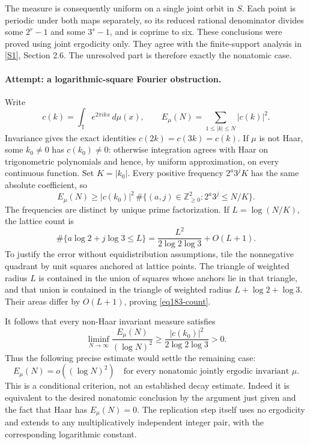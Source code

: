 \documentclass[11pt,a4paper]{article}
\newcommand{\Z}{\mathbb{Z}}
\newcommand{\sref}[2]{\hyperlink{source:#1:#2}{[S#2]}}
\numberwithin{equation}{section}
\begin{document}
The measure is consequently uniform on a single joint orbit in $S$. Each
point is periodic under both maps separately, so its reduced rational
denominator divides some $2^r-1$ and some $3^s-1$, and is coprime to six.
These conclusions were proved using joint ergodicity only. They agree
with the finite-support analysis in \sref{30006777}{1}, Section 2.6. The
unresolved part is therefore exactly the nonatomic case.

\paragraph{Attempt: a logarithmic-square Fourier obstruction.}
Write
\[
 c(k)=\int_{\mathbb T}e^{2\pi ikx}\,d\mu(x),\qquad
 E_\mu(N)=\sum_{1\le |k|\le N}|c(k)|^2.
\]
Invariance gives the exact identities $c(2k)=c(3k)=c(k)$. If $\mu$ is not
Haar, some $k_0\ne0$ has $c(k_0)\ne0$: otherwise integration agrees with
Haar on trigonometric polynomials and hence, by uniform approximation,
on every continuous function. Set $K=|k_0|$. Every positive frequency $2^a3^jK$ has the same
absolute coefficient, so
\[
 E_\mu(N)\ge |c(k_0)|^2\,
       \#\{(a,j)\in\Z_{\ge0}^2:2^a3^j\le N/K\}.
\]
The frequencies are distinct by unique prime factorization. If
$L=\log(N/K)$, the lattice count is
\begin{equation}\label{eq183-count}
 \#\{a\log2+j\log3\le L\}
       =\frac{L^2}{2\log2\log3}+O(L+1).
\end{equation}
To justify the error without equidistribution assumptions, tile the
nonnegative quadrant by unit squares anchored at lattice points. The
triangle of weighted radius $L$ is contained in the union of squares
whose anchors lie in that triangle, and that union is contained in the
triangle of weighted radius $L+\log2+\log3$. Their areas differ by
$O(L+1)$, proving \eqref{eq183-count}.

It follows that every non-Haar invariant measure satisfies
\begin{equation}\label{eq183-lower}
 \liminf_{N\to\infty}\frac{E_\mu(N)}{(\log N)^2}
                 \ge\frac{|c(k_0)|^2}{2\log2\log3}>0.
\end{equation}
Thus the following precise estimate would settle the remaining case:
\begin{equation}\label{eq183-missing}
 E_\mu(N)=o((\log N)^2)
 \quad\text{for every nonatomic jointly ergodic invariant }\mu.
\end{equation}
This is a conditional criterion, not an established decay estimate.
Indeed it is equivalent to the desired nonatomic conclusion by the
argument just given and the fact that Haar has $E_\mu(N)=0$. The replication step
itself uses no ergodicity and extends to any multiplicatively independent
integer pair, with the corresponding logarithmic constant.
\end{document}
